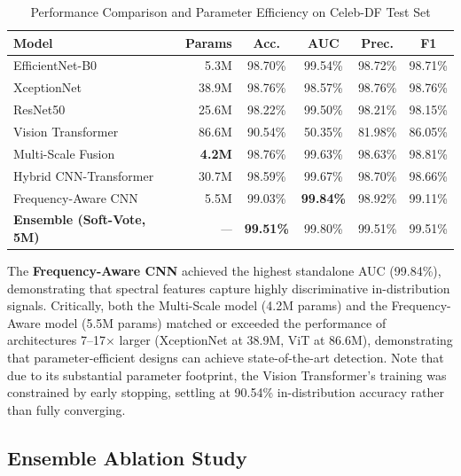\documentclass[runningheads]{llncs}
\begin{document}
\begin{table}[H]
\caption{Performance Comparison and Parameter Efficiency on Celeb-DF Test Set}
\label{tab:celebd_results}
\centering
\small
\setlength{\tabcolsep}{5pt}
\begin{tabular}{lrcccc}
\toprule
\textbf{Model} & \textbf{Params} & \textbf{Acc.} & \textbf{AUC} & \textbf{Prec.} & \textbf{F1} \\
\midrule
EfficientNet-B0   & 5.3M  & 98.70\% & 99.54\% & 98.72\% & 98.71\% \\
XceptionNet       & 38.9M & 98.76\% & 98.57\% & 98.76\% & 98.76\% \\
ResNet50          & 25.6M & 98.22\% & 99.50\% & 98.21\% & 98.15\% \\
Vision Transformer & 86.6M & 90.54\% & 50.35\% & 81.98\% & 86.05\% \\
\midrule
Multi-Scale Fusion      & \textbf{4.2M} & 98.76\% & 99.63\% & 98.63\% & 98.81\% \\
Hybrid CNN-Transformer  & 30.7M & 98.59\% & 99.67\% & 98.70\% & 98.66\% \\
Frequency-Aware CNN     & 5.5M  & 99.03\% & \textbf{99.84\%} & 98.92\% & 99.11\% \\
\midrule
\textbf{Ensemble (Soft-Vote, 5M)} & \textit{---} & \textbf{99.51\%} & 99.80\% & 99.51\% & 99.51\% \\
\bottomrule
\end{tabular}
\end{table}

The \textbf{Frequency-Aware CNN} achieved the highest standalone AUC (99.84\%), demonstrating that spectral features capture highly discriminative in-distribution signals. Critically, both the Multi-Scale model (4.2M params) and the Frequency-Aware model (5.5M params) matched or exceeded the performance of architectures 7--17$\times$ larger (XceptionNet at 38.9M, ViT at 86.6M), demonstrating that parameter-efficient designs can achieve state-of-the-art detection. Note that due to its substantial parameter footprint, the Vision Transformer's training was constrained by early stopping, settling at 90.54\% in-distribution accuracy rather than fully converging.

\subsection{Ensemble Ablation Study}
\end{document}
